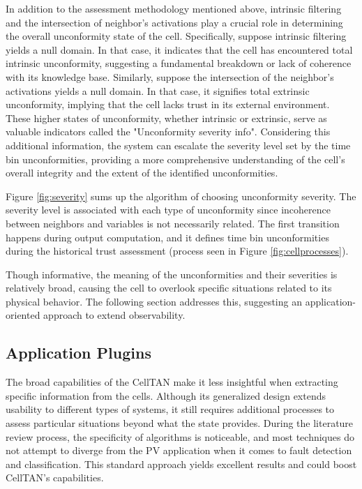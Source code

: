 In addition to the assessment methodology mentioned above, intrinsic filtering and the intersection of neighbor's activations play a crucial role in determining the overall unconformity state of the cell. Specifically, suppose intrinsic filtering yields a null domain. In that case, it indicates that the cell has encountered total intrinsic unconformity, suggesting a fundamental breakdown or lack of coherence with its knowledge base. Similarly, suppose the intersection of the neighbor's activations yields a null domain. In that case, it signifies total extrinsic unconformity, implying that the cell lacks trust in its external environment. These higher states of unconformity, whether intrinsic or extrinsic, serve as valuable indicators called the "Unconformity severity info". Considering this additional information, the system can escalate the severity level set by the time bin unconformities, providing a more comprehensive understanding of the cell's overall integrity and the extent of the identified unconformities.

Figure \ref{fig:severity} sums up the algorithm of choosing unconformity severity. The severity level is associated with each type of unconformity since incoherence between neighbors and variables is not necessarily related. The first transition happens during output computation, and it defines time bin unconformities during the historical trust assessment (process seen in Figure \ref{fig:cellprocesses}).

Though informative, the meaning of the unconformities and their severities is relatively broad, causing the cell to overlook specific situations related to its physical behavior. The following section addresses this, suggesting an application-oriented approach to extend observability.

\subsection{Application Plugins} \label{subsec:plugins}


The broad capabilities of the CellTAN make it less insightful when extracting specific information from the cells. Although its generalized design extends usability to different types of systems, it still requires additional processes to assess particular situations beyond what the state provides. During the literature review process, the specificity of algorithms is noticeable, and most techniques do not attempt to diverge from the PV application when it comes to fault detection and classification. This standard approach yields excellent results and could boost CellTAN's capabilities.

